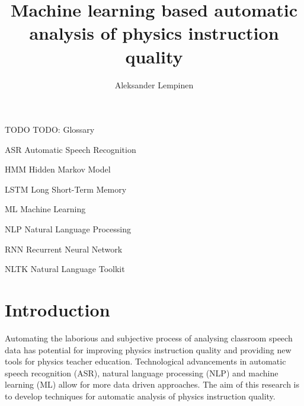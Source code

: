 \documentclass[utf8,english]{gradu3}
\begin{document}
\title{Machine learning based automatic analysis of physics instruction quality}

\author{Aleksander Lempinen}



\maketitle

\begin{thetermlist}
\item[TODO] TODO: Glossary
\item[ASR] Automatic Speech Recognition
\item[HMM] Hidden Markov Model
\item[LSTM] Long Short-Term Memory 
\item[ML] Machine Learning
\item[NLP] Natural Language Processing
\item[RNN] Recurrent Neural Network
\item[NLTK] Natural Language Toolkit
\end{thetermlist}

\mainmatter




\chapter{Introduction}
Automating the laborious and subjective process of analysing classroom speech data has potential for improving physics instruction quality and providing new tools for physics teacher education. Technological advancements in automatic speech recognition (ASR), natural language processing (NLP) and machine learning (ML) allow for more data driven approaches. The aim of this research is to develop techniques for automatic analysis of physics instruction quality.
\end{document}
